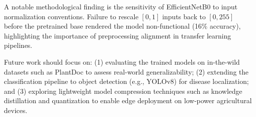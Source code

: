 \documentclass[10pt,twocolumn]{article}
\begin{document}
A notable methodological finding is the sensitivity of EfficientNetB0 to input normalization conventions. Failure to rescale $[0, 1]$ inputs back to $[0, 255]$ before the pretrained base rendered the model non-functional (16\% accuracy), highlighting the importance of preprocessing alignment in transfer learning pipelines.

Future work should focus on: (1) evaluating the trained models on in-the-wild datasets such as PlantDoc \cite{PlantDoc2020} to assess real-world generalizability; (2) extending the classification pipeline to object detection (e.g., YOLOv8) for disease localization; and (3) exploring lightweight model compression techniques such as knowledge distillation and quantization to enable edge deployment on low-power agricultural devices.

\end{document}
